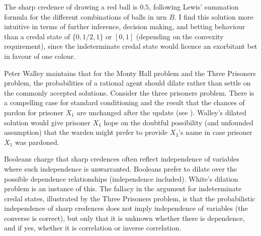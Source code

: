 \documentclass[11pt]{article}
\begin{document}

The sharp credence of drawing a red ball is $0.5$, following Lewis'
summation formula for the different combinations of balls in urn $B$.
I find this solution more intuitive in terms of further inference,
decision making, and betting behaviour than a credal state of
$\{0,1/2,1\}$ or $[0,1]$ (depending on the convexity requirement),
since the indeterminate credal state would licence an exorbitant bet
in favour of one colour.


Peter Walley maintains that for the Monty Hall problem and the Three
Prisoners problem, the probabilities of a rational agent should dilate
rather than settle on the commonly accepted solutions. Consider the
three prisoners problem. There is a compelling case for standard
conditioning and the result that the chances of pardon for prisoner
$X_{1}$ are unchanged after the update (see
). Walley's dilated solution would give
prisoner $X_{1}$ hope on the doubtful possibility (and unfounded
assumption) that the warden might prefer to provide $X_{3}$'s name in
case prisoner $X_{1}$ was pardoned.

Booleans charge that sharp credences often reflect independence of
variables where such independence is unwarranted. Booleans prefer to
dilate over the possible dependence relationships (independence
included). White's dilation problem is an instance of this. The
fallacy in the argument for indeterminate credal states, illustrated
by the Three Prisoners problem, is that the probabilistic independence
of sharp credences does not imply independence of variables (the
converse is correct), but only that it is unknown whether there is
dependence, and if yes, whether it is correlation or inverse
correlation.
\end{document}

